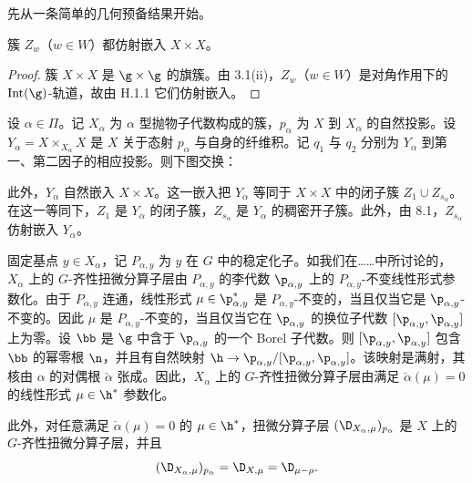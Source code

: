先从一条简单的几何预备结果开始。

\begin{lemma}\label{lem:03.8.1}
簇 $Z_w$（$w\in W$）都仿射嵌入 $X\times X$。
\end{lemma}

\begin{proof}
簇 $X\times X$ 是 $\g\times\g$ 的旗簇。由 3.1(ii)，$Z_w$（$w\in W$）是对角作用下的 $\operatorname{Int}(\g)$-轨道，故由 H.1.1 它们仿射嵌入。
\end{proof}

设 $\alpha\in\Pi$。记 $X_\alpha$ 为 $\alpha$ 型抛物子代数构成的簇，$p_\alpha$ 为 $X$ 到 $X_\alpha$ 的自然投影。设 $Y_\alpha=X\times_{X_\alpha}X$ 是 $X$ 关于态射 $p_\alpha$ 与自身的纤维积。记 $q_1$ 与 $q_2$ 分别为 $Y_\alpha$ 到第一、第二因子的相应投影。则下图交换：
\begin{center}
{\small{}}
\end{center}

此外，$Y_\alpha$ 自然嵌入 $X\times X$。这一嵌入把 $Y_\alpha$ 等同于 $X\times X$ 中的闭子簇 $Z_1\cup Z_{s_\alpha}$。在这一等同下，$Z_1$ 是 $Y_\alpha$ 的闭子簇，$Z_{s_\alpha}$ 是 $Y_\alpha$ 的稠密开子簇。此外，由 8.1，$Z_{s_\alpha}$ 仿射嵌入 $Y_\alpha$。

固定基点 $y\in X_\alpha$，记 $P_{\alpha,y}$ 为 $y$ 在 $G$ 中的稳定化子。如我们在……中所讨论的，$X_\alpha$ 上的 $G$-齐性扭微分算子层由 $P_{\alpha,y}$ 的李代数 $\p_{\alpha,y}$ 上的 $P_{\alpha,y}$-不变线性形式参数化。由于 $P_{\alpha,y}$ 连通，线性形式 $\mu\in\p_{\alpha,y}^*$ 是 $P_{\alpha,y}$-不变的，当且仅当它是 $\p_{\alpha,y}$-不变的。因此 $\mu$ 是 $P_{\alpha,y}$-不变的，当且仅当它在 $\p_{\alpha,y}$ 的换位子代数 $[\p_{\alpha,y},\p_{\alpha,y}]$ 上为零。设 $\bb$ 是 $\g$ 中含于 $\p_{\alpha,y}$ 的一个 Borel 子代数。则 $[\p_{\alpha,y},\p_{\alpha,y}]$ 包含 $\bb$ 的幂零根 $\n$，并且有自然映射 $\h\to\p_{\alpha,y}/[\p_{\alpha,y},\p_{\alpha,y}]$。该映射是满射，其核由 $\alpha$ 的对偶根 $\check\alpha$ 张成。因此，$X_\alpha$ 上的 $G$-齐性扭微分算子层由满足 $\check\alpha(\mu)=0$ 的线性形式 $\mu\in\h^*$ 参数化。

此外，对任意满足 $\check\alpha(\mu)=0$ 的 $\mu\in\h^*$，扭微分算子层 $(\D_{X_\alpha,\mu})_{p_\alpha}$ 是 $X$ 上的 $G$-齐性扭微分算子层，并且
$$(\D_{X_\alpha,\mu})_{p_\alpha}=\D_{X,\mu}=\D_{\mu-\rho}.$$

